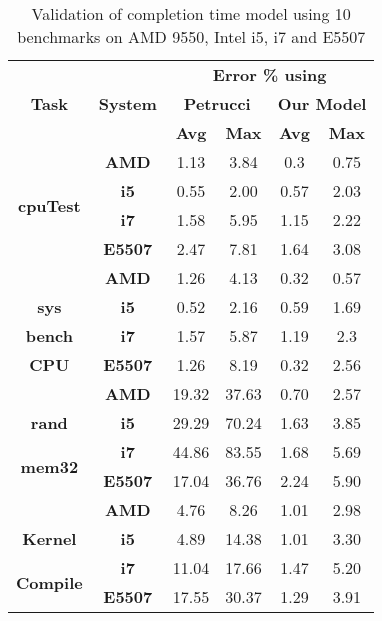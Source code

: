 \documentclass{sig-alternate}
\begin{document}
\begin{table}[!htbp]	
\vspace{-0.5cm}
\caption{Validation of completion time model using 10 benchmarks on AMD 9550, Intel i5, i7 and E5507}
\begin{center}
\begin{tabular}{|c||c||c|c||c|c|}
\hline
\multirow{3}{*}{\textbf{Task}} 	&	\multirow{3}{*}{\textbf{System}} 	&	\multicolumn{4}{c|}{\textbf{ Error \% using}}			\\ \cline{3-6}				
	&		&			\multicolumn{2}{c||}{\textbf{Petrucci \cite{Petrucci2011}}}	& 	\multicolumn{2}{c|}{\textbf{Our Model}}	\\ \cline{3-6}		
	&		&	\textbf{Avg}	&	\textbf{Max}	&	\textbf{Avg}	&	\textbf{Max}	\\ \hline
\multirow{4}{*}{\textbf{cpuTest}}	&	 \textbf{AMD}	&	1.13	&	3.84	&	0.3	&	0.75	\\ \cline{2-6}
	&	 \textbf{i5}	&	0.55	&	2.00	&	0.57	&	2.03	\\ \cline{2-6}
	&	 \textbf{i7}	&	1.58	&	5.95	&	1.15	&	2.22	\\ \cline{2-6}
	&	 \textbf{E5507}	&	2.47	&	7.81	&	1.64	&	3.08	\\ \hline\hline
											
	&	 \textbf{AMD}	&	1.26	&	4.13	&	0.32	&	0.57	\\ \cline{2-6}
\multirow{1}{*}{\textbf{sys}}	&	\textbf{ i5}	&	0.52	&	2.16	&	0.59	&	1.69	\\ \cline{2-6}
\multirow{1}{*}{\textbf{bench}}	&	\textbf{ i7}	&	1.57	&	5.87	&	1.19	&	2.3	\\ \cline{2-6}
\multirow{1}{*}{\textbf{CPU}}	&	 \textbf{E5507}	&	1.26	&	8.19	&	0.32	&	2.56	\\ \hline\hline
											
	&	 \textbf{AMD}	&	19.32	&	37.63	&	0.70	&	2.57	\\ \cline{2-6}
\multirow{1}{*}{\textbf{rand}}	&	 \textbf{i5}	&	29.29	&	70.24	&	1.63	&	3.85	\\ \cline{2-6}
\multirow{2}{*}{\textbf{mem32}}	&	 \textbf{i7}	&	44.86	&	83.55	&	1.68	&	5.69	\\ \cline{2-6}
	&	 \textbf{E5507}	&	17.04	&	36.76	&	2.24	&	5.90	\\ \hline\hline
											
	&	 \textbf{AMD}	&	4.76	&	8.26	&	1.01	&	2.98	\\ \cline{2-6}
\multirow{1}{*}{\textbf{Kernel}}	&	 \textbf{i5}	&	4.89	&	14.38	&	1.01	&	3.30	\\ \cline{2-6}
\multirow{2}{*}{\textbf{Compile}}	&	 \textbf{i7}	&	11.04	&	17.66	&	1.47	&	5.20	\\ \cline{2-6}
	&	 \textbf{E5507}	&	17.55	&	30.37	&	1.29	&	3.91	\\ \hline\hline
											

\end{tabular}
\end{center}
\end{table}
\end{document}
